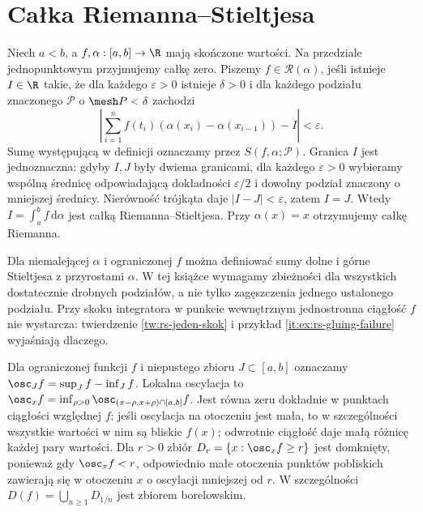 \section{Całka Riemanna--Stieltjesa}
\providecommand{\atlasref}[2]{#2}
\begin{definicja}\label{it:def:rs-integral}
Niech $a<b$, a $f,\alpha:[a,b]\to\R$ mają skończone wartości. Na przedziale jednopunktowym przyjmujemy całkę zero. Piszemy $f\in\mathcal R(\alpha)$, jeśli istnieje $I\in\R$ takie, że dla każdego $\varepsilon>0$ istnieje $\delta>0$ i dla każdego podziału znaczonego $\mathcal P$ o $\mesh P<\delta$ zachodzi
\[
\left|\sum_{i=1}^n f(t_i)(\alpha(x_i)-\alpha(x_{i-1}))-I\right|<\varepsilon.
\]
Sumę występującą w definicji oznaczamy przez $S(f,\alpha;\mathcal P)$. Granica $I$ jest jednoznaczna: gdyby $I,J$ były dwiema granicami, dla każdego $\varepsilon>0$ wybieramy wspólną średnicę odpowiadającą dokładności $\varepsilon/2$ i dowolny podział znaczony o mniejszej średnicy. Nierówność trójkąta daje $|I-J|<\varepsilon$, zatem $I=J$. Wtedy $I=\int_a^b f\,\mathrm d\alpha$ jest całką Riemanna--Stieltjesa. Przy $\alpha(x)=x$ otrzymujemy całkę Riemanna.
\end{definicja}
\begin{uwaga}[Rozszerzenie]
Dla niemalejącej $\alpha$ i ograniczonej $f$ można definiować sumy dolne i górne Stieltjesa z przyrostami $\alpha$. W tej książce wymagamy zbieżności dla wszystkich dostatecznie drobnych podziałów, a nie tylko zagęszczenia jednego ustalonego podziału. Przy skoku integratora w punkcie wewnętrznym jednostronna ciągłość $f$ nie wystarcza: twierdzenie \ref{tw:rs-jeden-skok} i przykład \ref{it:ex:rs-gluing-failure} wyjaśniają dlaczego.
\end{uwaga}
Dla ograniczonej funkcji $f$ i niepustego zbioru $J\subset[a,b]$ oznaczamy $\osc_J f=\sup_J f-\inf_J f$. Lokalna oscylacja to $\osc_x f=\inf_{\rho>0}\osc_{(x-\rho,x+\rho)\cap[a,b]}f$. Jest równa zeru dokładnie w punktach ciągłości względnej $f$: jeśli oscylacja na otoczeniu jest mała, to w szczególności wszystkie wartości w nim są bliskie $f(x)$; odwrotnie ciągłość daje małą różnicę każdej pary wartości. Dla $r>0$ zbiór $D_r=\{x:\osc_x f\ge r\}$ jest domknięty, ponieważ gdy $\osc_x f<r$, odpowiednio małe otoczenia punktów pobliskich zawierają się w otoczeniu $x$ o oscylacji mniejszej od $r$. W szczególności $D(f)=\bigcup_{n\ge1}D_{1/n}$ jest zbiorem borelowskim.

